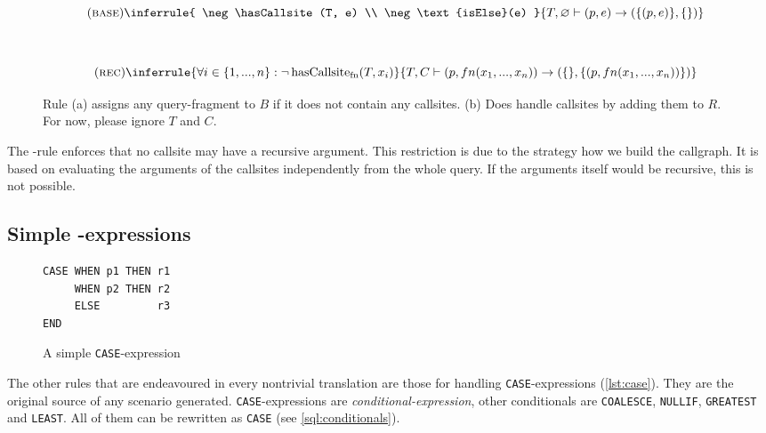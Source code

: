 \begin{figure}[h]\small
    \begin{minipage}[b]{\linewidth}
    \centering %
    
  $$
\quad(\textsc{base})\inferrule{
   \neg \hasCallsite(T, e) \\
   \neg \text{isElse}(e)
}{
    T, \varnothing \vdash (p, e) \rightarrow (\{(p, e)\},\{\})
}$$
    \subcaption{}\label{rule:base}
    \end{minipage}\\
    \begin{minipage}[b]{\linewidth}
    \centering %
$$\quad(\textsc{rec})\inferrule{
   \forall i \in \{1, ..., n\} : \neg \hasCallsite(T, x_i)
}{
    T, C \vdash (p, fn(x_1, ..., x_n)) \rightarrow (\{\}, \{(p, fn(x_1, ..., x_n))\})
}
$$
    \subcaption{}\label{rule:rec}
    \end{minipage}
    \caption{Rule (a) assigns any query-fragment to $B$ if it does not contain any callsites. (b) Does handle callsites by adding them to $R$. For now, please ignore $T$ and $C$.}\label{rule:base_and_rec}
\end{figure}

The \RREC-rule enforces that no callsite may have a recursive argument. This restriction is due to the strategy how we build the callgraph. It is based on evaluating the arguments of the callsites independently from the whole query. If the arguments itself would be recursive, this is not possible.

\subsection{Simple \CASE-expressions}
\begin{wrapfigure}{r}{.3\textwidth}\centering
\begin{verbatim}
CASE WHEN p1 THEN r1
     WHEN p2 THEN r2
     ELSE         r3
END
\end{verbatim}
\caption{A simple \texttt{CASE}-expression}\vspace{-5mm} 
\label{lst:case}
\end{wrapfigure}

The other rules that are endeavoured in every nontrivial translation are those for handling \texttt{CASE}-expressions (\autoref{lst:case}). They are the original source of any scenario generated. \texttt{CASE}-expressions are \textit{conditional-expression}, other conditionals are \texttt{COALESCE}, \texttt{NULLIF}, \texttt{GREATEST} and \texttt{LEAST}. All of them can be rewritten as \texttt{CASE} (see \autoref{sql:conditionals}).

